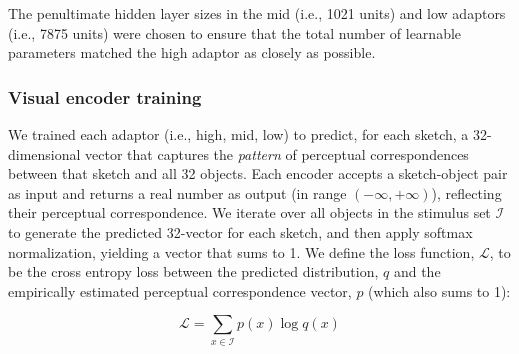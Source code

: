 \documentclass[9pt,twocolumn,twoside]{pnas-new}
\begin{document}
{The penultimate hidden layer sizes in the mid (i.e., 1021 units) and low adaptors (i.e., 7875 units) were chosen to ensure that the total number of learnable parameters matched the high adaptor as closely as possible. 


\subsubsection*{Visual encoder training}

We trained each adaptor (i.e., high, mid, low) to predict, for each sketch, a 32-dimensional vector that captures the \textit{pattern} of perceptual correspondences between that sketch and all 32 objects. 
Each encoder accepts a sketch-object pair as input and returns a real number as output (in range $(-\infty, + \infty)$), reflecting their perceptual correspondence.
We iterate over all objects in the stimulus set $\mathcal{I}$ to generate the predicted 32-vector for each sketch, and then apply softmax normalization, yielding a vector that sums to 1. 
We define the loss function, $\mathcal{L}$, to be the cross entropy loss between the predicted distribution, $q$ and the empirically estimated perceptual correspondence vector, $p$ (which also sums to 1):

\begin{equation}
    \mathcal{L} = \sum_{x \in \mathcal{I}} p(x)\log q(x)
    \label{eqn:cross_entropy}
\end{equation}


}
\end{document}
